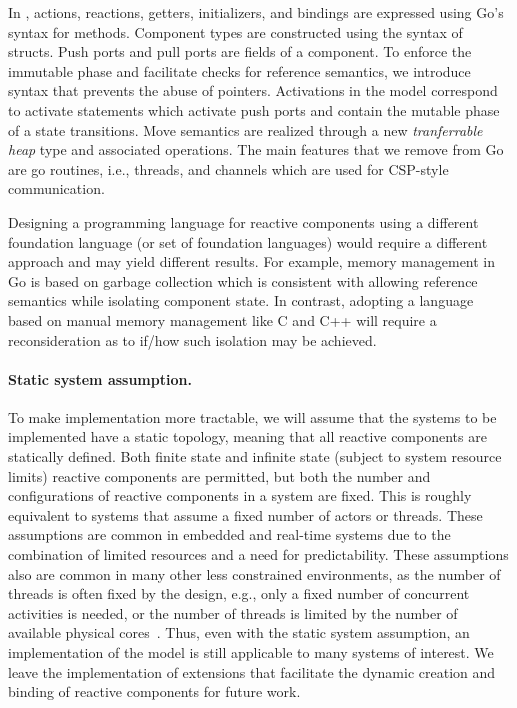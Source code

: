 In \rcgo{}, actions, reactions, getters, initializers, and bindings are expressed using Go's syntax for methods.
Component types are constructed using the syntax of structs.
Push ports and pull ports are fields of a component.
To enforce the immutable phase and facilitate checks for reference semantics, we introduce syntax that prevents the abuse of pointers.
Activations in the model correspond to activate statements which activate push ports and contain the mutable phase of a state transitions.
Move semantics are realized through a new \emph{tranferrable heap} type and associated operations.
The main features that we remove from Go are go routines, i.e., threads, and channels which are used for CSP-style communication.

Designing a programming language for reactive components using a different foundation language (or set of foundation languages) would require a different approach and may yield different results.
For example, memory management in Go is based on garbage collection which is consistent with allowing reference semantics while isolating component state.
In contrast, adopting a language based on manual memory management like C and C++ will require a reconsideration as to if/how such isolation may be achieved.

\paragraph{Static system assumption.}
To make implementation more tractable, we will assume that the systems to be implemented have a static topology, meaning that all reactive components are statically defined.
Both finite state and infinite state (subject to system resource limits) reactive components are permitted, but both the number and configurations of reactive components in a system are fixed.
This is roughly equivalent to systems that assume a fixed number of actors or threads.
These assumptions are common in embedded and real-time systems due to the combination of limited resources and a need for predictability.
These assumptions also are common in many other less constrained environments, as the number of threads is often fixed by the design, e.g., only a fixed number of concurrent activities is needed, or the number of threads is limited by the number of available physical cores~\cite{williams2012c++}.
Thus, even with the static system assumption, an implementation of the model is still applicable to many systems of interest.
We leave the implementation of extensions that facilitate the dynamic creation and binding of reactive components for future work.

